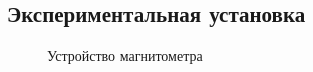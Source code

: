\documentclass[a4paper, 12pt]{article}
\begin{document}
	\subsection*{Экспериментальная установка}
	\begin{figure}[h]
		\begin{minipage}[h]{0.5\linewidth}
		\end{minipage}
		\begin{minipage}[h]{0.5\linewidth}
		\end{minipage}
		\caption{Устройство магнитометра}
		\label{ris:station}
	\end{figure}
\end{document}
